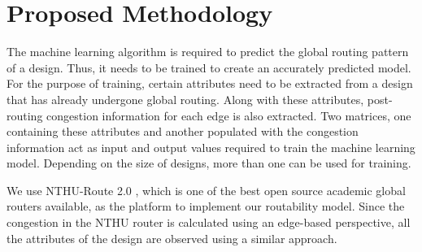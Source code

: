\section{Proposed Methodology}
\label{sec:methodology}
The machine learning algorithm is required to predict the global routing pattern of a design. Thus, it needs to be trained to create an accurately predicted model. For the purpose of training, certain attributes need to be extracted from a design that has already undergone global routing. Along with these attributes, post-routing congestion information for each edge is also extracted. Two matrices, one containing these attributes and another populated with the congestion information act as input and output values required to train the machine learning model. Depending on the size of designs, more than one can be used for training.

We use NTHU-Route 2.0 \cite{NTHU}, which is one of the best open source academic global routers available, as the platform to implement our routability model. Since the congestion in the NTHU router is calculated using an edge-based perspective, all the attributes of the design are observed using a similar approach. 

